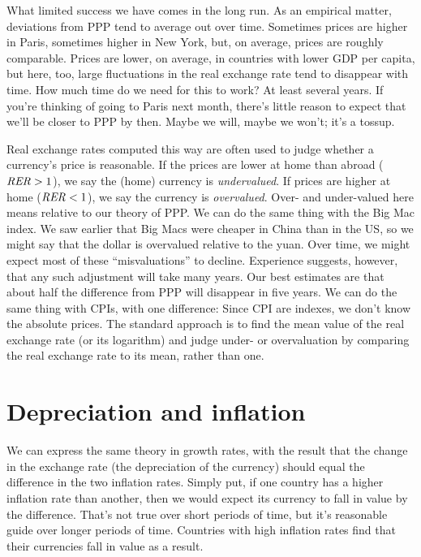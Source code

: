 What limited success we have comes in the long run.
As an empirical matter,
deviations from PPP tend to average out over time.
Sometimes prices are higher in Paris, sometimes higher in New York,
but, on average, prices are roughly comparable.
Prices are lower, on average, in countries with lower GDP per capita, but here, too, large fluctuations in the real exchange rate tend to disappear
with time.
How much time do we need for this to work?
At least several years.
If you're thinking of going to Paris next month,
there's little reason to expect that we'll be closer to PPP by then.
Maybe we will, maybe we won't; it's a tossup.


Real exchange rates computed this way are often used to judge whether
a currency's price is reasonable.
If the prices are lower at home than abroad ($\mbox{\it RER\/} > 1$),
we say the (home) currency is {\it undervalued\/}.
If prices are higher at home ($\mbox{\it RER\/} < 1$),
we say the currency is {\it overvalued\/}.
Over- and under-valued here means relative to our theory of PPP.
We can do the same thing with the Big Mac index.
We saw earlier that Big Macs were cheaper in China than in the US, so we might say that the dollar is overvalued relative to the yuan. Over time, we might expect most of these ``misvaluations'' to decline.
Experience suggests, however, that any such adjustment will take many years.
Our best estimates are that about half the difference from PPP will disappear
in five years. We can do the same thing with CPIs, with one difference: Since CPI are indexes, we don't know the absolute prices. The standard approach is to find the mean value of the real exchange rate
(or its logarithm) and judge under- or overvaluation by comparing the
real exchange rate to its mean, rather than one.


\section{Depreciation and inflation}

We can express the same theory in growth rates,
with the result that the change in the exchange rate
(the depreciation of the currency)
should equal the difference in the two inflation rates.
Simply put,
if one country has a higher inflation rate than another,
then we would expect its currency to fall in value
by the difference.
That's not true over short periods of time,
but it's reasonable guide over longer periods of time.
Countries with high inflation rates find
that their currencies fall in value as a result.

